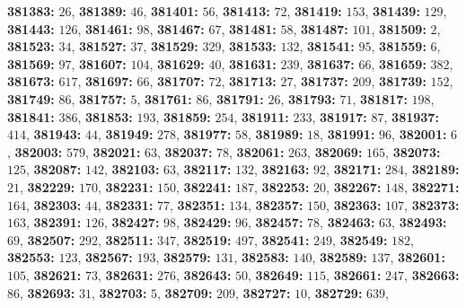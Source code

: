\textsf{\bfseries 381383:} $26$, \textsf{\bfseries 381389:} $46$, \textsf{\bfseries 381401:} $56$, \textsf{\bfseries 381413:} $72$, \textsf{\bfseries 381419:} $153$, \textsf{\bfseries 381439:} $129$, \textsf{\bfseries 381443:} $126$, \textsf{\bfseries 381461:} $98$, \textsf{\bfseries 381467:} $67$, \textsf{\bfseries 381481:} $58$, \textsf{\bfseries 381487:} $101$, \textsf{\bfseries 381509:} $2$, \textsf{\bfseries 381523:} $34$, \textsf{\bfseries 381527:} $37$, \textsf{\bfseries 381529:} $329$, \textsf{\bfseries 381533:} $132$, \textsf{\bfseries 381541:} $95$, \textsf{\bfseries 381559:} $6$, \textsf{\bfseries 381569:} $97$, \textsf{\bfseries 381607:} $104$, \textsf{\bfseries 381629:} $40$, \textsf{\bfseries 381631:} $239$, \textsf{\bfseries 381637:} $66$, \textsf{\bfseries 381659:} $382$, \textsf{\bfseries 381673:} $617$, \textsf{\bfseries 381697:} $66$, \textsf{\bfseries 381707:} $72$, \textsf{\bfseries 381713:} $27$, \textsf{\bfseries 381737:} $209$, \textsf{\bfseries 381739:} $152$, \textsf{\bfseries 381749:} $86$, \textsf{\bfseries 381757:} $5$, \textsf{\bfseries 381761:} $86$, \textsf{\bfseries 381791:} $26$, \textsf{\bfseries 381793:} $71$, \textsf{\bfseries 381817:} $198$, \textsf{\bfseries 381841:} $386$, \textsf{\bfseries 381853:} $193$, \textsf{\bfseries 381859:} $254$, \textsf{\bfseries 381911:} $233$, \textsf{\bfseries 381917:} $87$, \textsf{\bfseries 381937:} $414$, \textsf{\bfseries 381943:} $44$, \textsf{\bfseries 381949:} $278$, \textsf{\bfseries 381977:} $58$, \textsf{\bfseries 381989:} $18$, \textsf{\bfseries 381991:} $96$, \textsf{\bfseries 382001:} $6$, \textsf{\bfseries 382003:} $579$, \textsf{\bfseries 382021:} $63$, \textsf{\bfseries 382037:} $78$, \textsf{\bfseries 382061:} $263$, \textsf{\bfseries 382069:} $165$, \textsf{\bfseries 382073:} $125$, \textsf{\bfseries 382087:} $142$, \textsf{\bfseries 382103:} $63$, \textsf{\bfseries 382117:} $132$, \textsf{\bfseries 382163:} $92$, \textsf{\bfseries 382171:} $284$, \textsf{\bfseries 382189:} $21$, \textsf{\bfseries 382229:} $170$, \textsf{\bfseries 382231:} $150$, \textsf{\bfseries 382241:} $187$, \textsf{\bfseries 382253:} $20$, \textsf{\bfseries 382267:} $148$, \textsf{\bfseries 382271:} $164$, \textsf{\bfseries 382303:} $44$, \textsf{\bfseries 382331:} $77$, \textsf{\bfseries 382351:} $134$, \textsf{\bfseries 382357:} $150$, \textsf{\bfseries 382363:} $107$, \textsf{\bfseries 382373:} $163$, \textsf{\bfseries 382391:} $126$, \textsf{\bfseries 382427:} $98$, \textsf{\bfseries 382429:} $96$, \textsf{\bfseries 382457:} $78$, \textsf{\bfseries 382463:} $63$, \textsf{\bfseries 382493:} $69$, \textsf{\bfseries 382507:} $292$, \textsf{\bfseries 382511:} $347$, \textsf{\bfseries 382519:} $497$, \textsf{\bfseries 382541:} $249$, \textsf{\bfseries 382549:} $182$, \textsf{\bfseries 382553:} $123$, \textsf{\bfseries 382567:} $193$, \textsf{\bfseries 382579:} $131$, \textsf{\bfseries 382583:} $140$, \textsf{\bfseries 382589:} $137$, \textsf{\bfseries 382601:} $105$, \textsf{\bfseries 382621:} $73$, \textsf{\bfseries 382631:} $276$, \textsf{\bfseries 382643:} $50$, \textsf{\bfseries 382649:} $115$, \textsf{\bfseries 382661:} $247$, \textsf{\bfseries 382663:} $86$, \textsf{\bfseries 382693:} $31$, \textsf{\bfseries 382703:} $5$, \textsf{\bfseries 382709:} $209$, \textsf{\bfseries 382727:} $10$, \textsf{\bfseries 382729:} $639$, 
